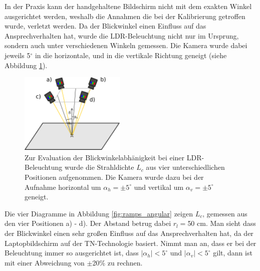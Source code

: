     In der Praxis kann der handgehaltene Bildschirm nicht mit dem exakten Winkel ausgerichtet werden, weshalb die Annahmen die bei der Kalibrierung getroffen wurde, verletzt werden.
    Da der Blickwinkel einen Einfluss auf das Ansprechverhalten hat, wurde die LDR-Beleuchtung nicht nur im Ursprung, sondern auch unter verschiedenen Winkeln gemessen.
    Die Kamera wurde dabei jeweils 5$^\circ$ in die horizontale, und in die vertikale Richtung geneigt (siehe Abbildung \ref{fig:angles}). 

 
   \begin{figure}[h]
    \centering
    \includegraphics[width=0.45\textwidth]{../graphics/beleuchtung/angle_evaluation_angles.svg}
    \caption[Evaluation der LDR Beleuchtung (Winkel): Aufnahmewinkel]{Zur Evaluation der Blickwinkelabhänigkeit bei einer LDR-Beleuchtung wurde die Strahldichte $L_c$ aus vier unterschiedlichen Positionen aufgenommen. Die Kamera wurde dazu bei der Aufnahme horizontal um $\alpha_h=\pm5^\circ$ und vertikal um $\alpha_v=\pm5^\circ$ geneigt. }
    \label{fig:angles}
   \end{figure}
       
    Die vier Diagramme in Abbildung \ref{fig:ramps_angular} zeigen $L_c$, gemessen aus den vier Positionen a) - d). 
    Der Abstand betrug dabei $r_l=$50 cm.
   Man sieht dass der Blickwinkel einen sehr großen Einfluss auf das Ansprechverhalten hat, da der Laptopbildschirm auf der TN-Technologie basiert.
    Nimmt man an, dass er bei der Beleuchtung immer so ausgerichtet ist, dass $|\alpha_h| < 5^\circ$ und $|\alpha_v| < 5^\circ$ gilt, dann ist mit einer Abweichung von $\pm$20\% zu rechnen.
    
    

